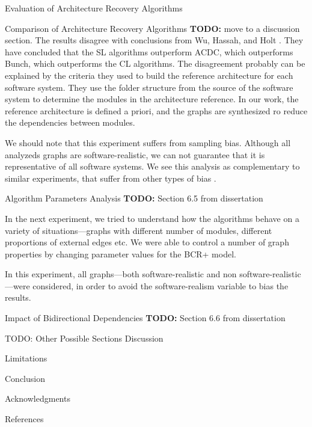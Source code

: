 \documentclass[11pt,twocolumn,a4paper,english]{article}
\newcommand{\TODO}{\textbf{TODO:} }
\begin{document}
\begin{section}{Evaluation of Architecture Recovery Algorithms}
\begin{subsection}{Comparison of Architecture Recovery Algorithms}
	\TODO move to a discussion section.
	The results disagree with conclusions from Wu, Hassah, and Holt \cite{Wu2005}. They have concluded that the SL algorithms outperform ACDC, which outperforms Bunch, which outperforms the CL algorithms. The disagreement probably can be explained by the criteria they used to build the reference architecture for each software system. They use the folder structure from the source of the software system to determine the modules in the architecture reference. In our work, the reference architecture is defined a priori, and the graphs are synthesized ro reduce the dependencies between modules.
	
	We should note that this experiment suffers from sampling bias. Although all analyzeds graphs are software-realistic, we can not guarantee that it is representative of all software systems. We see this analysis as complementary to similar experiments, that suffer from other types of bias \cite{Wu2005,Bittencourt2009,Andritsos2005}.
	
\end{subsection}	

\begin{subsection}{Algorithm Parameters Analysis}
	\TODO Section 6.5 from dissertation
	
	In the next experiment, we tried to understand how the algorithms behave on a variety of situations---graphs with different number of modules, different proportions of external edges etc. We were able to control a number of graph properties by changing parameter values for the BCR+ model.
	
	In this experiment, all graphs---both software-realistic and non software-realistic---were considered, in order to avoid the software-realism variable to bias the results.
	
	
	
\end{subsection}

\begin{subsection}{Impact of Bidirectional Dependencies}
	\TODO Section 6.6 from dissertation
\end{subsection}

\end{section}


\begin{section}{TODO: Other Possible Sections}
	Discussion
	
	Limitations
	
	Conclusion
	
	Acknowledgments
	
	References	
\end{section}




\end{document}
